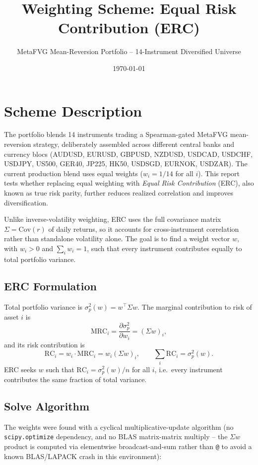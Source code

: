 \documentclass[11pt]{article}
\title{Weighting Scheme: Equal Risk Contribution (ERC)}
\author{MetaFVG Mean-Reversion Portfolio -- 14-Instrument Diversified Universe}
\date{\today}
\begin{document}
\maketitle

\section{Scheme Description}

The portfolio blends 14 instruments trading a Spearman-gated MetaFVG mean-reversion
strategy, deliberately assembled across different central banks and currency blocs
(AUDUSD, EURUSD, GBPUSD, NZDUSD, USDCAD, USDCHF, USDJPY, US500, GER40, JP225, HK50,
USDSGD, EURNOK, USDZAR). The current production blend uses equal weights
($w_i = 1/14$ for all $i$). This report tests whether replacing equal weighting with
\emph{Equal Risk Contribution} (ERC), also known as true risk parity, further reduces
realized correlation and improves diversification.

Unlike inverse-volatility weighting, ERC uses the full covariance matrix
$\Sigma = \mathrm{Cov}(r)$ of daily returns, so it accounts for cross-instrument
correlation rather than standalone volatility alone. The goal is to find a weight
vector $w$, with $w_i > 0$ and $\sum_i w_i = 1$, such that every instrument
contributes equally to total portfolio variance.

\subsection{ERC Formulation}

Total portfolio variance is $\sigma_p^2(w) = w^\top \Sigma w$. The marginal
contribution to risk of asset $i$ is
\[
  \mathrm{MRC}_i = \frac{\partial \sigma_p^2}{\partial w_i} = (\Sigma w)_i,
\]
and its risk contribution is
\[
  \mathrm{RC}_i = w_i \cdot \mathrm{MRC}_i = w_i (\Sigma w)_i, \qquad
  \sum_i \mathrm{RC}_i = \sigma_p^2(w).
\]
ERC seeks $w$ such that $\mathrm{RC}_i = \sigma_p^2(w) / n$ for all $i$, i.e.\ every
instrument contributes the same fraction of total variance.

\subsection{Solve Algorithm}

The weights were found with a cyclical multiplicative-update algorithm (no
\texttt{scipy.optimize} dependency, and no BLAS matrix-matrix multiply -- the
$\Sigma w$ product is computed via elementwise broadcast-and-sum rather than \texttt{@}
to avoid a known BLAS/LAPACK crash in this environment):
\end{document}
